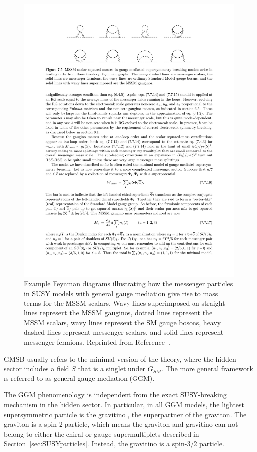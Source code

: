 \begin{figure}[htbp]
    \centering
        \includegraphics[width=\textwidth]{Figures/Theory/GMSBscalar.pdf}
    \caption{Example Feynman diagrams illustrating how the messenger particles in SUSY models
    with general gauge mediation give rise to mass terms for 
    the MSSM scalars. Wavy lines superimposed on straight lines represent the MSSM gauginos, 
    dotted lines represent the MSSM scalars, wavy lines represent the SM gauge bosons, heavy dashed lines
    represent messenger scalars, and solid lines represent messenger fermions.
    Reprinted from Reference~\cite{SUSYprimer}.}
    \label{fig:GMSBscalars}
\end{figure}

GMSB usually refers to the minimal version of the theory, where the hidden sector includes a field $S$ that is a singlet under $G_{SM}$. 
The more general framework is referred to as general gauge mediation (GGM). 

The GGM phenomenology is independent from the exact SUSY-breaking mechanism in the hidden sector. In particular, 
in all GGM models, the lightest supersymmetric particle is the gravitino \gravitino, the superpartner of the graviton. 
The graviton is a spin-2 particle, which means the graviton and gravitino can not belong to either the chiral or gauge supermultiplets described in Section~\ref{sec:SUSYparticles}. Instead, the gravitino is a spin-3/2 particle.

